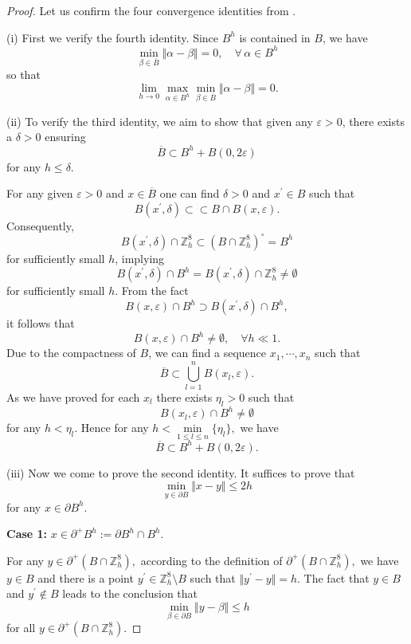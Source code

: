 \documentclass[10pt,a4paper]{amsart}
\newcommand{\Z}{\mathbb Z}
\newcommand{\p}{\partial}
\begin{document}
\begin{proof} Let us  confirm the four convergence identities from .

    \bigskip
    (i) First we verify the fourth identity. Since $B^h$ is contained in $B$, we have \begin{equation*}
        \min_{\beta\in \overline B } \Vert \alpha-\beta\Vert=0, \quad \forall \,\alpha\in B^h
    \end{equation*}
    so that  \[
\lim_{h\to 0} \max_{\alpha\in B^h }\min_{\beta\in \overline B } \Vert \alpha-\beta\Vert=0.
\]

    \bigskip

    (ii) To verify the third identity, we aim to show that given any $\varepsilon>0$, there exists a $\delta>0$ ensuring \[
\overline B \subset B^h + B(0, 2\varepsilon	)
\]   for any $h \leqslant \delta$.

    For any given 	$\varepsilon>0$ and $x \in \overline  B$ one can find $\delta > 0$ and $x^\prime \in  B$ such that \[
B(x^\prime,\delta ) \subset\subset B \cap B(x, \varepsilon	).
\]
    Consequently,
    \[
B(x^\prime,\delta) \cap \Z^8_h \subset  (B \cap \Z^8_h)^\circ  = B^h
\]
     for sufficiently small
  $h$, implying
     \[
B(x^\prime,\delta) \cap B^h = B(x^\prime,\delta) \cap \Z^8_h \neq \emptyset
\] for sufficiently small
     $h$.    From the fact \[
B(x,\varepsilon 	) \cap B^h \supset B(x^\prime,\delta) \cap B^h,
\] it follows that \begin{equation}
        \label{2023-09-11 16:15:35}
        B(x,\varepsilon 	) \cap B^h \neq \emptyset,\quad \forall h\ll 1.
    \end{equation}
    Due to the compactness of $B$, we can find a sequence $x_1,\cdots,x_n$ such that
    \[
\overline B\subset \bigcup\limits_{l=1}^n B(x_l,\varepsilon).
\] As we have proved for each $x_l$ there exists $\eta_l > 0$ such that \[
B(x_l,\varepsilon)\cap B^h  \neq \emptyset
\] for any $h<\eta_l.$ Hence for any $h<\min\limits_{1\leqslant l\leqslant n}\{\eta_l\},$ we have  \[
\overline B \subset B^h + B(0, 2\varepsilon	).
\]
    \bigskip

    (iii) Now we come to prove the second identity. It suffices to prove that \[
\min_{y\in \p B} \Vert x-y\Vert \leqslant 2h
\] for any  $x\in \p B^h$.

    {\bf Case 1:}  $x\in \p^+ B^h:= \p B^h\cap B^h.$

    \bigskip
    For any $y\in \p^+(B\cap \Z^8_h),$ according to the definition of $\p^+(B\cap \Z^8_h),$ we have $y \in B$ and there is a point $y^\prime \in \Z^8_h\setminus B$ such that $\Vert y^\prime-y \Vert = h.$ The fact that $y \in B$ and $y^\prime \notin  B$ leads to the conclusion that \[
\mathop{\min}\limits_{\beta \in \p B}\Vert y-\beta \Vert \leqslant h
\]
   for all  $y\in \p^+(B\cap \Z^8_h)$.







\end{proof}
\end{document}
